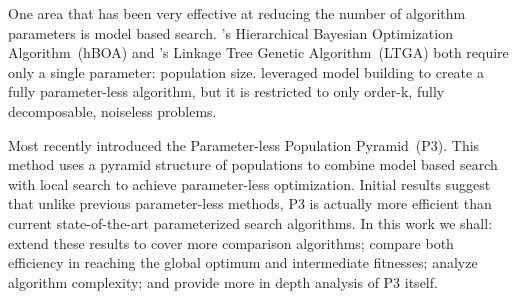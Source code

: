 One area that has been very effective at reducing the number of algorithm parameters is
model based search. \cite{pelikan:2006:hboa}'s Hierarchical Bayesian Optimization
Algorithm~(hBOA) and \cite{thierens:2010:ltga}'s Linkage Tree Genetic Algorithm~(LTGA)
both require only a single parameter: population size. \cite{posik:2011:parameterless}
leveraged model building to create a fully parameter-less algorithm, but it is restricted to
only order-k, fully decomposable, noiseless problems.

Most recently \cite{goldman:2014:p3} introduced the Parameter-less Population Pyramid~(P3).
This method uses a pyramid structure of populations to combine model based search with local search
to achieve parameter-less optimization. Initial results suggest that unlike
previous parameter-less methods, P3 is actually more efficient than current state-of-the-art
parameterized search algorithms. In this work we shall: extend these results to cover more
comparison algorithms; compare both efficiency in reaching the global optimum and intermediate
fitnesses; analyze algorithm complexity; and provide more in depth analysis of P3 itself.

